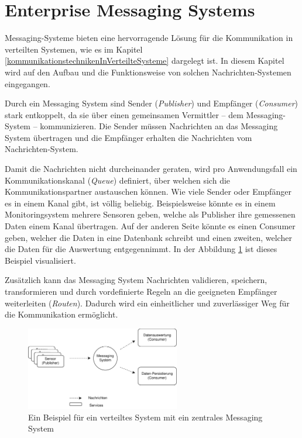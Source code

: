\section{Enterprise Messaging Systems}

Messaging-Systeme bieten eine hervorragende Lösung für die Kommunikation in verteilten Systemen, wie es im Kapitel \ref{kommunikationstechnikenInVerteilteSysteme} dargelegt ist. In diesem Kapitel wird auf den Aufbau und die Funktionsweise von solchen Nachrichten-Systemen eingegangen. \cite{curryMessageOrientedMiddleware2004}

Durch ein Messaging System sind Sender (\emph{Publisher}) und Empfänger (\emph{Consumer}) stark entkoppelt, da sie über einen gemeinsamen Vermittler – dem Messaging-System – kommunizieren. Die Sender müssen Nachrichten an das Messaging System übertragen und die Empfänger erhalten die Nachrichten vom Nachrichten-System. \cite{curryMessageOrientedMiddleware2004}

Damit die Nachrichten nicht durcheinander geraten, wird pro Anwendungsfall ein Kommunikationskanal (\emph{Queue}) definiert, über welchen sich die Kommunikationspartner austauschen können. Wie viele Sender oder Empfänger es in einem Kanal gibt, ist völlig beliebig. Beispielsweise könnte es in einem Monitoringsystem mehrere Sensoren geben, welche als Publisher ihre gemessenen Daten einem Kanal übertragen. Auf der anderen Seite könnte es einen Consumer geben, welcher die Daten in eine Datenbank schreibt und einen zweiten, welcher die Daten für die Auswertung entgegennimmt. In der Abbildung \ref{fig:beispeilSensorenMessagingSysteme} ist dieses Beispiel visualisiert. \cite{curryMessageOrientedMiddleware2004}

Zusätzlich kann das Messaging System Nachrichten validieren, speichern, transformieren und durch vordefinierte Regeln an die geeigneten Empfänger weiterleiten (\emph{Routen}). Dadurch wird ein einheitlicher und zuverlässiger Weg für die Kommunikation ermöglicht. \cite{curryMessageOrientedMiddleware2004}

\begin{figure}
    \centering
    \includegraphics[width=0.6\textwidth]{content/img/Research/Message_Services/beispeilSensorenMessagingSysteme.png}
    \caption{Ein Beispiel für ein verteiltes System mit ein zentrales Messaging System}
    \label{fig:beispeilSensorenMessagingSysteme}
\end{figure}
\FloatBarrier

